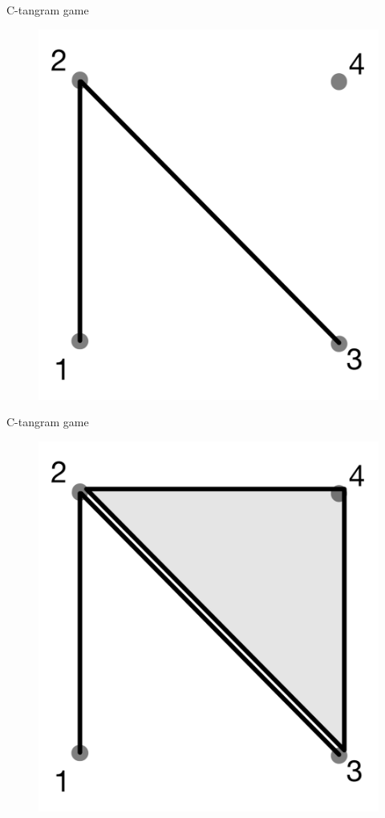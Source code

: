 \documentclass{beamer}
\begin{document}
\begin{frame}{C-tangram game}
    \begin{figure}
        \centering
        \includegraphics[scale=0.16]{images/Step2.png}
    \end{figure}
\end{frame}

\begin{frame}{C-tangram game}
    \begin{figure}
        \centering
        \includegraphics[scale=0.16]{images/Step3.png}
    \end{figure}
\end{frame}
\end{document}
